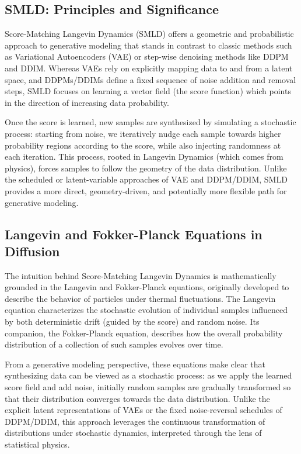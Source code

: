 \documentclass{article}
\begin{document}
	\subsection{SMLD: Principles and Significance}
	
	Score-Matching Langevin Dynamics (SMLD) offers a geometric and probabilistic approach to generative modeling that stands in contrast to classic methods such as Variational Autoencoders (VAE) or step-wise denoising methods like DDPM and DDIM. Whereas VAEs rely on explicitly mapping data to and from a latent space, and DDPMs/DDIMs define a fixed sequence of noise addition and removal steps, SMLD focuses on learning a vector field (the score function) which points in the direction of increasing data probability. 
	
	Once the score is learned, new samples are synthesized by simulating a stochastic process: starting from noise, we iteratively nudge each sample towards higher probability regions according to the score, while also injecting randomness at each iteration. This process, rooted in Langevin Dynamics (which comes from physics), forces samples to follow the geometry of the data distribution. Unlike the scheduled or latent-variable approaches of VAE and DDPM/DDIM, SMLD provides a more direct, geometry-driven, and potentially more flexible path for generative modeling.
	
	\subsection{Langevin and Fokker-Planck Equations in Diffusion}
	
	The intuition behind Score-Matching Langevin Dynamics is mathematically grounded in the Langevin and Fokker-Planck equations, originally developed to describe the behavior of particles under thermal fluctuations. The Langevin equation characterizes the stochastic evolution of individual samples influenced by both deterministic drift (guided by the score) and random noise. Its companion, the Fokker-Planck equation, describes how the overall probability distribution of a collection of such samples evolves over time.
	
	From a generative modeling perspective, these equations make clear that synthesizing data can be viewed as a stochastic process: as we apply the learned score field and add noise, initially random samples are gradually transformed so that their distribution converges towards the data distribution. Unlike the explicit latent representations of VAEs or the fixed noise-reversal schedules of DDPM/DDIM, this approach leverages the continuous transformation of distributions under stochastic dynamics, interpreted through the lens of statistical physics.
	
\end{document}
